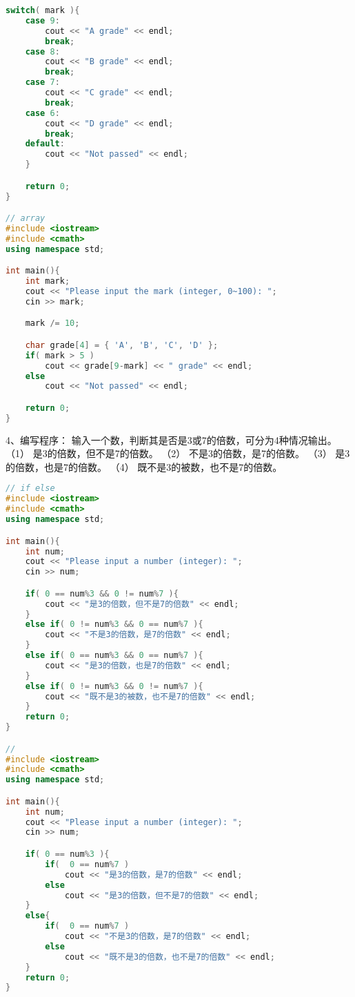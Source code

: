 \documentclass[14pt,aps,prb]{revtex4}
\begin{document}
\begin{spacing}{1.5}
\begin{lstlisting}[language=C++]
    switch( mark ){
    case 9:
        cout << "A grade" << endl;
        break;
    case 8:
        cout << "B grade" << endl;
        break;
    case 7:
        cout << "C grade" << endl;
        break;
    case 6:
        cout << "D grade" << endl;
        break;
    default:
        cout << "Not passed" << endl;
    }

    return 0;
}

// array
#include <iostream>
#include <cmath>
using namespace std;

int main(){
    int mark;
    cout << "Please input the mark (integer, 0~100): ";
    cin >> mark;

    mark /= 10;

    char grade[4] = { 'A', 'B', 'C', 'D' };
    if( mark > 5 )
        cout << grade[9-mark] << " grade" << endl;
    else
        cout << "Not passed" << endl;

    return 0;
}
\end{lstlisting}

4、编写程序： 输入一个数，判断其是否是3或7的倍数，可分为4种情况输出。
（1） 是3的倍数，但不是7的倍数。 
（2） 不是3的倍数，是7的倍数。
（3） 是3的倍数，也是7的倍数。 
（4） 既不是3的被数，也不是7的倍数。
\begin{lstlisting}[language=C++]
// if else
#include <iostream>
#include <cmath>
using namespace std;

int main(){
    int num;
    cout << "Please input a number (integer): ";
    cin >> num;

    if( 0 == num%3 && 0 != num%7 ){
        cout << "是3的倍数，但不是7的倍数" << endl;
    }
    else if( 0 != num%3 && 0 == num%7 ){
        cout << "不是3的倍数，是7的倍数" << endl;
    }
    else if( 0 == num%3 && 0 == num%7 ){
        cout << "是3的倍数，也是7的倍数" << endl;
    }
    else if( 0 != num%3 && 0 != num%7 ){
        cout << "既不是3的被数，也不是7的倍数" << endl;
    }
    return 0;
}

//
#include <iostream>
#include <cmath>
using namespace std;

int main(){
    int num;
    cout << "Please input a number (integer): ";
    cin >> num;

    if( 0 == num%3 ){
        if(  0 == num%7 )
            cout << "是3的倍数，是7的倍数" << endl;
        else
            cout << "是3的倍数，但不是7的倍数" << endl;
    }
    else{
        if(  0 == num%7 )
            cout << "不是3的倍数，是7的倍数" << endl;
        else
            cout << "既不是3的倍数，也不是7的倍数" << endl;
    }
    return 0;
}
\end{lstlisting}


\end{spacing}
\end{document}
